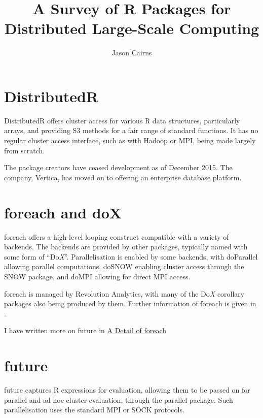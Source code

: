 \documentclass[10pt,a4paper]{article}
\begin{document}
\title{A Survey of R Packages for Distributed Large-Scale Computing}
\author{Jason Cairns}
  
\maketitle{}

\tableofcontents{}

\section{DistributedR}
\label{sec:distributedr}
DistributedR offers cluster access for various R data structures,
particularly arrays, and providing S3 methods for a fair range of
standard functions. It has no regular cluster access interface, such
as with Hadoop or MPI, being made largely from scratch.

The package creators have ceased development as of December 2015. The
company, Vertica, has moved on to offering an enterprise database
platform\cite{vertica:_distr}.

\section{foreach and doX}
\label{sec:foreach-dox}

foreach offers a high-level looping construct compatible with a
variety of backends\cite{microsoft20}. The backends are provided by
other packages, typically named with some form of ``Do\textit{X}''.
Parallelisation is enabled by some backends, with doParallel allowing
parallel computations\cite{corporation19}, doSNOW enabling cluster
access through the SNOW package\cite{dosnow19}, and doMPI allowing for
direct MPI access\cite{weston17}.

foreach is managed by Revolution Analytics, with many of the
Do\textit{X} corollary packages also being produced by them. Further
information of foreach is given in \textcite{weston19:_using}.

I have written more on future in \href{detail-foreach.pdf}{A Detail of foreach}

\section{future}
\label{sec:future-furrr}

future captures R expressions for evaluation, allowing them to be
passed on for parallel and ad-hoc cluster evaluation, through the
parallel package\cite{bengtsson20}. Such parallelisation uses the
standard MPI or SOCK protocols.
\end{document}
